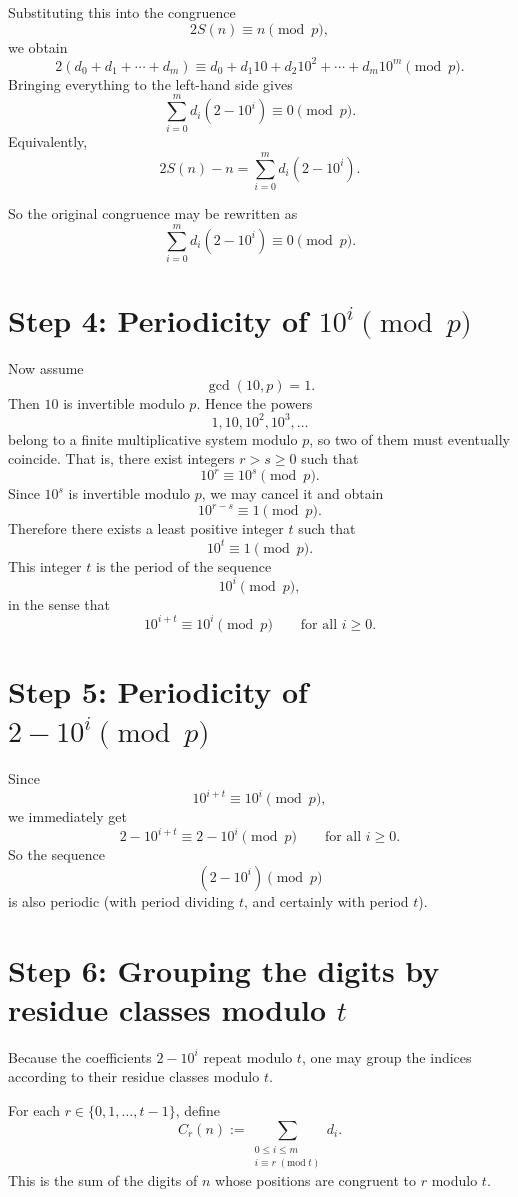 \documentclass[12pt]{article}
\begin{document}
Substituting this into the congruence
\[
2S(n)\equiv n \pmod p,
\]
we obtain
\[
2(d_0+d_1+\cdots+d_m)\equiv d_0+d_1 10+d_2 10^2+\cdots+d_m 10^m \pmod p.
\]
Bringing everything to the left-hand side gives
\[
\sum_{i=0}^m d_i(2-10^i)\equiv 0 \pmod p.
\]
Equivalently,
\[
2S(n)-n=\sum_{i=0}^m d_i(2-10^i).
\]

So the original congruence may be rewritten as
\[
\sum_{i=0}^m d_i(2-10^i)\equiv 0 \pmod p.
\]

\section*{Step 4: Periodicity of \(10^i \pmod p\)}

Now assume
\[
\gcd(10,p)=1.
\]
Then \(10\) is invertible modulo \(p\). Hence the powers
\[
1,10,10^2,10^3,\dots
\]
belong to a finite multiplicative system modulo \(p\), so two of them must eventually coincide.
That is, there exist integers \(r>s\geq 0\) such that
\[
10^r\equiv 10^s \pmod p.
\]
Since \(10^s\) is invertible modulo \(p\), we may cancel it and obtain
\[
10^{r-s}\equiv 1 \pmod p.
\]
Therefore there exists a least positive integer \(t\) such that
\[
10^t\equiv 1 \pmod p.
\]
This integer \(t\) is the period of the sequence
\[
10^i \pmod p,
\]
in the sense that
\[
10^{i+t}\equiv 10^i \pmod p
\qquad\text{for all } i\geq 0.
\]

\section*{Step 5: Periodicity of \(2-10^i \pmod p\)}

Since
\[
10^{i+t}\equiv 10^i \pmod p,
\]
we immediately get
\[
2-10^{i+t}\equiv 2-10^i \pmod p
\qquad\text{for all } i\geq 0.
\]
So the sequence
\[
(2-10^i)\pmod p
\]
is also periodic (with period dividing \(t\), and certainly with period \(t\)).

\section*{Step 6: Grouping the digits by residue classes modulo \(t\)}

Because the coefficients \(2-10^i\) repeat modulo \(t\), one may group the indices according to their residue classes modulo \(t\).

For each \(r\in\{0,1,\dots,t-1\}\), define
\[
C_r(n):=\sum_{\substack{0\leq i\leq m\\ i\equiv r \;(\mathrm{mod}\; t)}} d_i.
\]
This is the sum of the digits of \(n\) whose positions are congruent to \(r\) modulo \(t\).
\end{document}
